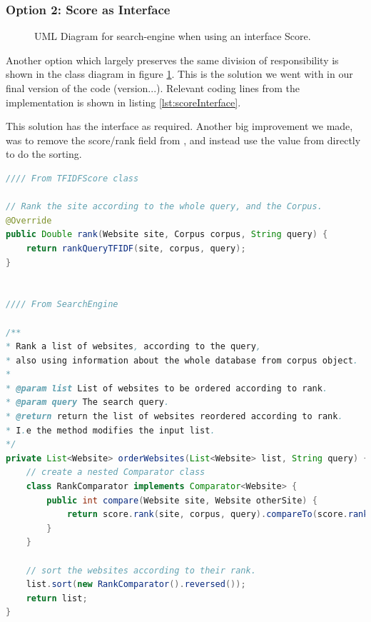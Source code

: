 \subsubsection{Option 2: Score as Interface}
\begin{figure}[t]
	\centering
	\caption{UML Diagram for search-engine when using an interface Score.}
	\label{fig:uml:score-as-interface}
\end{figure}
Another option which largely preserves the same division of responsibility is shown in the class diagram in figure \ref{fig:uml:score-as-interface}.    
This is the solution we went with in our final version of the code (version...). Relevant coding lines from the implementation is shown in listing \ref{lst:scoreInterface}.

This solution has the  interface as required. Another big improvement we made, was to remove the score/rank field from , and instead use the value from  directly to do the sorting.  




\begin{lstlisting}[language={Java}, caption={This is a code example.}, label={lst:scoreInterface}]
//// From TFIDFScore class 

// Rank the site according to the whole query, and the Corpus.
@Override
public Double rank(Website site, Corpus corpus, String query) {
	return rankQueryTFIDF(site, corpus, query);
}


//// From SearchEngine 

/**
* Rank a list of websites, according to the query, 
* also using information about the whole database from corpus object. 
*
* @param list List of websites to be ordered according to rank.
* @param query The search query.
* @return return the list of websites reordered according to rank.
* I.e the method modifies the input list.  
*/
private List<Website> orderWebsites(List<Website> list, String query) {
	// create a nested Comparator class
	class RankComparator implements Comparator<Website> {
		public int compare(Website site, Website otherSite) {
			return score.rank(site, corpus, query).compareTo(score.rank(otherSite, corpus, query));
		}
	}

	// sort the websites according to their rank.
	list.sort(new RankComparator().reversed());     
	return list;
}
\end{lstlisting}



